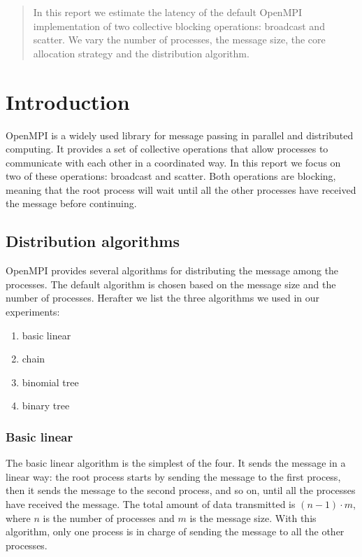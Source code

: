 %
%
\begin{abstract}
    In this report we estimate the latency of the default OpenMPI
    implementation of two collective blocking operations: broadcast
    and scatter. We vary the number of processes, the message size,    
    the core allocation strategy and the distribution algorithm.
\end{abstract}

\maketitle

\section{Introduction}
    OpenMPI is a widely used library for message passing in parallel
    and distributed computing. It provides a set of collective operations
    that allow processes to communicate with each other in a coordinated
    way. In this report we focus on two of these operations: broadcast
    and scatter. Both operations are blocking, meaning that the root
    process will wait until all the other processes have received the
    message before continuing.


\subsection{Distribution algorithms}
    OpenMPI provides several algorithms for distributing the message
    among the processes. The default algorithm is chosen based on the
    message size and the number of processes. Herafter we list the three
    algorithms we used in our experiments:
    \begin{enumerate}
        \item basic linear
        \item chain
        \item binomial tree
        \item binary tree
    \end{enumerate}
\subsubsection{Basic linear}
    The basic linear algorithm is the simplest of the four. It sends
    the message in a linear way: the root process starts by sending
    the message to the first process, then it sends the message to the
    second process, and so on, until all the processes have received
    the message. The total amount of data transmitted is $(n-1) \cdot m$,
    where $n$ is the number of processes and $m$ is the message size.
    With this algorithm, only one process is in charge of sending the
    message to all the other processes.

